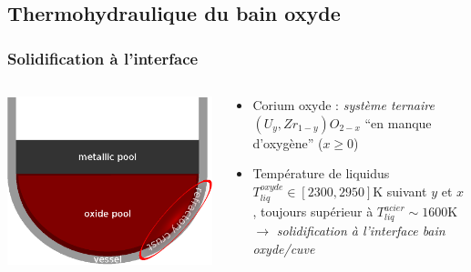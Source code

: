 \subsection{Thermohydraulique du bain oxyde}
\subsubsection{Solidification à l'interface}
\begin{frame}[fragile]
\begin{columns}[T]
    \begin{column}{0.25\textwidth}
\centering \includegraphics[height=0.3\textheight]{Figures/TD_2layer_crust.eps}
    \end{column}
    \begin{column}{0.75\textwidth}
\begin{itemize}
\item Corium oxyde : \emph{système ternaire} $\left(U_y,Zr_{1-y}\right)O_{2-x}$ ``en manque d'oxygène'' ($x\ge0$)
\item Température de liquidus $T_{liq}^{oxyde} \in [2300, 2950]$K suivant $y$ et $x$, toujours supérieur à $T_{liq}^{acier} \sim 1600$K $\rightarrow$ \emph{solidification à l'interface bain oxyde/cuve}
    \end{itemize}
    \end{column}
\end{columns}
\begin{minipage}{0.8\textwidth}
\begin{tabular}{cc}

\end{tabular}
\end{minipage}
\end{frame}
